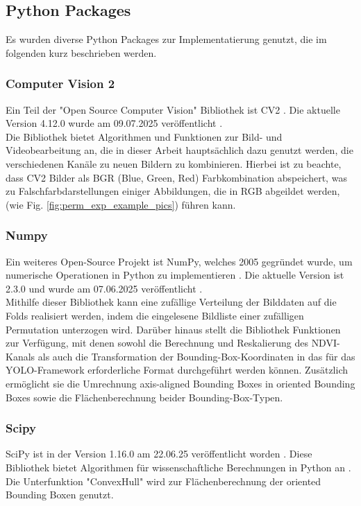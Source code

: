 \subsection{Python Packages}
Es wurden diverse Python Packages zur Implementatierung genutzt, die im folgenden kurz beschrieben werden. 
\subsubsection{Computer Vision 2}
Ein Teil der "Open Source Computer Vision" Bibliothek ist \Acrfull{CV2} \cite{opencv_about}. Die aktuelle Version 4.12.0 wurde am 09.07.2025 veröffentlicht \cite{opencv_release}. \\
Die Bibliothek bietet Algorithmen und Funktionen zur Bild- und Videobearbeitung an, die in dieser Arbeit hauptsächlich dazu genutzt werden, die verschiedenen Kanäle zu neuen Bildern zu kombinieren. Hierbei ist zu beachte, dass \acrshort{CV2} Bilder als BGR (Blue, Green, Red) Farbkombination abspeichert, was zu Falschfarbdarstellungen einiger Abbildungen, die in RGB abgeildet werden, (wie Fig. \ref{fig:perm_exp_example_pics}) führen kann.
\subsubsection{Numpy}
Ein weiteres Open-Source Projekt ist NumPy, welches 2005 gegründet wurde, um numerische Operationen in Python zu implementieren \cite{numpy_about}. Die aktuelle Version ist 2.3.0 und wurde am 07.06.2025 veröffentlicht \cite{numpy_main_web}. \\
Mithilfe dieser Bibliothek kann eine zufällige Verteilung der Bilddaten auf die Folds realisiert werden, indem die eingelesene Bildliste einer zufälligen Permutation unterzogen wird. Darüber hinaus stellt die Bibliothek Funktionen zur Verfügung, mit denen sowohl die Berechnung und Reskalierung des \acrshort{NDVI}-Kanals als auch die Transformation der Bounding-Box-Koordinaten in das für das \acrshort{YOLO}-Framework erforderliche Format durchgeführt werden können. Zusätzlich ermöglicht sie die Umrechnung axis-aligned Bounding Boxes in oriented Bounding Boxes sowie die Flächenberechnung beider Bounding-Box-Typen.
\subsubsection{Scipy}
SciPy ist in der Version 1.16.0 am 22.06.25 veröffentlicht worden \cite{scipy-main}. Diese Bibliothek bietet Algorithmen für wissenschaftliche Berechnungen in Python an \cite{scipy-main}. Die Unterfunktion "ConvexHull" wird zur Flächenberechnung der oriented Bounding Boxen genutzt.
